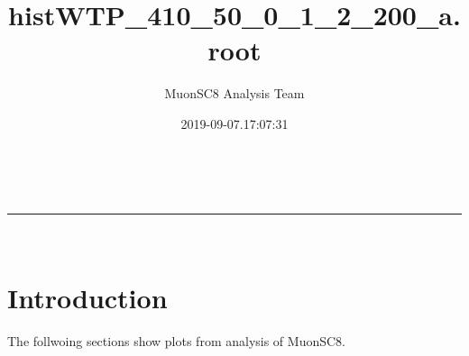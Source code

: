 \documentclass[a4paper,11pt]{article}
\makeatletter
\newcommand{\linia}{\rule{\linewidth}{0.5pt}}
\theoremstyle{mytheor}
\renewcommand{\maketitle}{
\begin{center}
\vspace{2ex}
{\huge \textsc{\@title}}
\vspace{1ex}
\\
\linia\\
\@author \hfill \@date
\vspace{4ex}
\end{center}
}
\makeatother
\begin{document}
\title{histWTP\_410\_50\_0\_1\_2\_200\_a.root}

\author{MuonSC8 Analysis Team }

\date{2019-09-07.17:07:31}

\maketitle

\section{Introduction}

The follwoing sections show plots from analysis of MuonSC8. 





\end{document}
